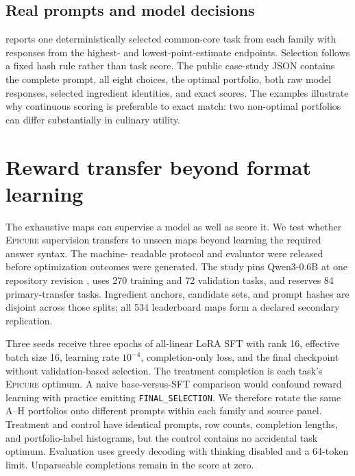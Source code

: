 \documentclass[10pt,twocolumn]{article}
\newcommand{\epicure}{\textsc{Epicure}}
\begin{document}
\subsection{Real prompts and model decisions}

 reports one deterministically selected common-core task from each family with
responses from the highest- and lowest-point-estimate endpoints. Selection follows a fixed hash
rule rather than task score. The public
case-study JSON contains the complete prompt, all eight choices, the
optimal portfolio, both raw model responses, selected ingredient identities, and exact scores.
The examples illustrate why continuous scoring is preferable to exact match: two non-optimal
portfolios can differ substantially in culinary utility.

\begin{table}[t]
  \centering
  \scriptsize
  \setlength{\tabcolsep}{3pt}
  
  \caption{Three common-core response examples. Parentheses give the fixed task score. The complete
  prompts and unabridged responses are released in machine-readable form.}
  \label{tab:examples}
\end{table}

\clearpage
\section{Reward transfer beyond format learning}
\label{sec:training}

The exhaustive maps can supervise a model as well as score it. We test whether \epicure{}
supervision transfers to unseen maps beyond learning the required answer syntax. The machine-
readable protocol and evaluator were released before optimization outcomes were generated. The
study pins Qwen3-0.6B at one repository revision \cite{yang2025qwen3}, uses 270 training and 72
validation tasks, and reserves 84 primary-transfer tasks. Ingredient anchors, candidate sets, and
prompt hashes are disjoint across those splits; all 534 leaderboard maps form a declared secondary
replication.

Three seeds receive three epochs of all-linear LoRA SFT \cite{hu2022lora} with rank 16, effective
batch size 16, learning rate $10^{-4}$, completion-only loss, and the final checkpoint without
validation-based selection. The treatment completion is each task's \epicure{} optimum. A naive
base-versus-SFT comparison would confound reward learning with practice emitting
\texttt{FINAL\_SELECTION}. We therefore rotate the same A--H portfolios onto different prompts
within each family and source panel. Treatment and control have identical prompts, row counts,
completion lengths, and portfolio-label histograms, but the control contains no accidental task
optimum. Evaluation uses greedy decoding with thinking disabled and a 64-token limit. Unparseable
completions remain in the score at zero.
\end{document}
